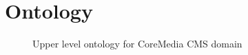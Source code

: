 \chapter{Ontology}
\label{appendix:onto}

\begin{figure}[H]
  \caption[Upper level domain specific ontology]%
          {Upper level ontology for CoreMedia \gls{CMS} domain}
  \label{appendix:ontology}
\end{figure}
